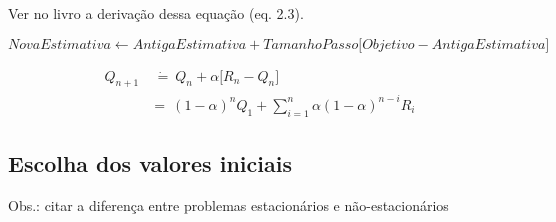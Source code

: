\documentclass{article}
\begin{document}
        Ver no livro a derivação dessa equação (eq. 2.3).
        
        \begin{equation}
            NovaEstimativa \leftarrow AntigaEstimativa + TamanhoPasso \Big[ Objetivo - AntigaEstimativa \Big]
        \end{equation}
        
        \begin{equation}
        \begin{split}
            Q_{n+1} & \ \dot{=} \ Q_n + \alpha \Big[ R_n - Q_n \Big] \\
            & = \ (1 - \alpha)^n Q_1 + \sum_{i=1}^{n} \alpha (1 - \alpha)^{n - i} R_i
        \end{split}
        \end{equation}
        
    \subsection{Escolha dos valores iniciais}
        
        Obs.: citar a diferença entre problemas estacionários e não-estacionários
    
\end{document}
